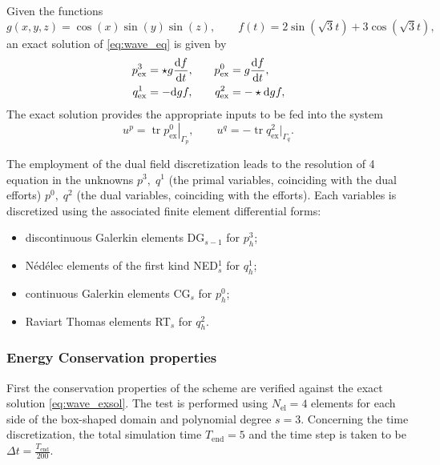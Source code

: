 \documentclass{elsarticle}
\renewcommand\d{\ensuremath{\mathrm{d}}}
\DeclareMathOperator{\tr}{tr}
\begin{document}
Given the functions
\begin{equation}
    g(x, y, z) = \cos(x) \sin(y) \sin(z), \qquad f(t) = 2 \sin(\sqrt{3} t) + 3 \cos(\sqrt{3} t),
\end{equation}
an exact solution of \eqref{eq:wave_eq} is given by
\begin{equation}\label{eq:wave_exsol}
\begin{aligned}
p^3_{\mathrm{ex}} &= \star g \diff{f}{t}, \\    
q^1_{\mathrm{ex}} &= -\d{g} f, 
\end{aligned} \qquad 
\begin{aligned}
p^0_{\mathrm{ex}} &= g \diff{f}{t}, \\
q^2_{\mathrm{ex}} &= -\star \d{g} f,
\end{aligned}
\end{equation}
The exact solution provides the appropriate inputs to be fed into the system
\begin{equation}
    u^p = \left. \tr p^0_{\mathrm{ex}} \right\vert_{\Gamma_p}, \qquad u^q =  -\tr q^2_{\mathrm{ex}} \vert_{\Gamma_q}.
\end{equation}

The employment of the dual field discretization leads to the resolution of 4 equation in the unknowns $p^3, \; q^1$ (the primal variables, coinciding with the dual efforts) $p^0, \; q^2$ (the dual variables, coinciding with the efforts). Each variables is discretized using the associated finite element differential forms:
\begin{itemize}
    \item discontinuous Galerkin elements DG$_{s-1}$ for $p^3_h$;
    \item Nédélec elements of the first kind NED$_s^1$ for $q^1_h$;
    \item continuous Galerkin elements CG$_s$ for $p^0_h$;
    \item Raviart Thomas elements RT$_s$ for $q^2_h$.
\end{itemize}


\subsubsection{Energy Conservation properties}
First the conservation properties of the scheme are verified against the exact solution \eqref{eq:wave_exsol}. The test is performed using $N_{\text{el}}=4$ elements for each side of the box-shaped domain and polynomial degree $s=3$. Concerning the time discretization, the total simulation time $T_{\text{end}}=5$ and the time step is taken to be $\Delta t= \frac{T_{\text{end}}}{200}$. \\
\end{document}
